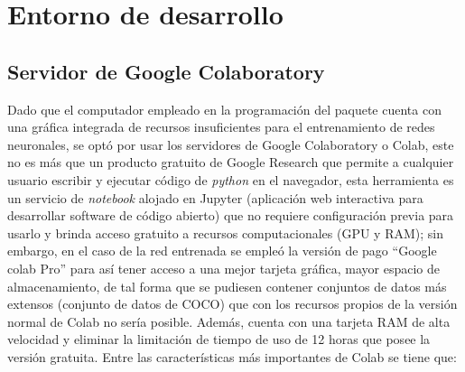 \section{Entorno de desarrollo}
\subsection{Servidor de Google Colaboratory}
Dado que el computador empleado en la programación del paquete cuenta con una gráfica integrada de recursos insuficientes para el entrenamiento de redes neuronales, se optó por usar los servidores de Google Colaboratory o Colab, este no es más que un producto gratuito de Google Research que permite a cualquier usuario escribir y ejecutar código de \textit{python} en el navegador, esta herramienta es un servicio de \textit{notebook} alojado en Jupyter (aplicación web interactiva para desarrollar software de código abierto) que no requiere configuración previa para usarlo y brinda acceso gratuito a recursos computacionales (GPU y RAM); sin embargo, en el caso de la red entrenada se empleó la versión de pago ``Google colab Pro'' para así tener acceso a una mejor tarjeta gráfica, mayor espacio de almacenamiento, de tal forma que se pudiesen contener conjuntos de datos más extensos (conjunto de datos de COCO) que con los recursos propios de la versión normal de Colab no sería posible.  Además, cuenta con una tarjeta RAM de alta velocidad y eliminar la limitación de tiempo de uso de 12 horas que posee la versión gratuita. Entre las características más importantes de Colab se tiene que:
